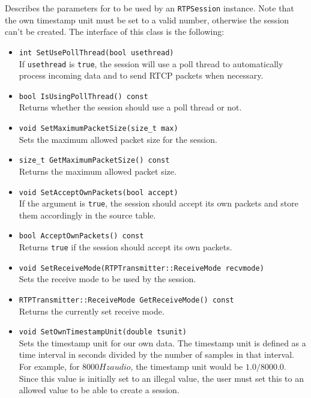 \documentclass[12pt,a4paper]{article}
\begin{document}
				Describes the parameters for to be used by an {\tt RTPSession}
				instance. Note that the own timestamp unit must be set to a
				valid number, otherwise the session can't be created.
				The interface of this class is the following:
				\begin{itemize}
					\item {\tt int SetUsePollThread(bool usethread)}\\
						If {\tt usethread} is {\tt true}, the session will
						use a poll thread to automatically process incoming
						data and to send RTCP packets when necessary.
					\item {\tt bool IsUsingPollThread() const}\\
						Returns whether the session should use a poll thread
						or not.
					\item {\tt void SetMaximumPacketSize(size\_t max)}\\
						Sets the maximum allowed packet size for the session.
					\item {\tt size\_t GetMaximumPacketSize() const}\\
						Returns the maximum allowed packet size.
					\item {\tt void SetAcceptOwnPackets(bool accept)}\\
						If the argument is {\tt true}, the session should accept
						its own packets and store them accordingly in the source
						table.
					\item {\tt bool AcceptOwnPackets() const}\\
						Returns {\tt true} if the session should accept its
						own packets.
					\item {\tt void SetReceiveMode(RTPTransmitter::ReceiveMode recvmode)}\\
						Sets the receive mode to be used by the session.
					\item {\tt RTPTransmitter::ReceiveMode GetReceiveMode() const}\\
						Returns the currently set receive mode.
					\item {\tt void SetOwnTimestampUnit(double tsunit)}\\
						Sets the timestamp unit for our own data. The timestamp
						unit is defined as a time interval in seconds divided by
						the number of samples in that interval. For example, for
						$8000 Hz audio$, the timestamp unit would be $1.0/8000.0$.
						Since this value is initially set to an illegal value, the
						user must set this to an allowed value to be able to create
						a session.

\end{itemize}
\end{document}
